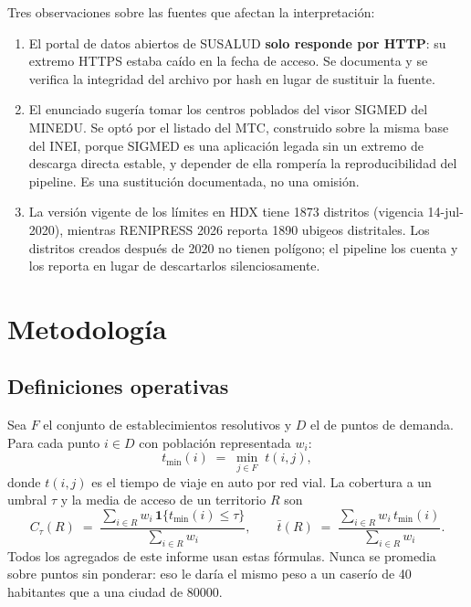\documentclass[10pt,a4paper]{article}
\begin{document}
Tres observaciones sobre las fuentes que afectan la interpretación:

\begin{enumerate}
\item El portal de datos abiertos de SUSALUD \textbf{solo responde por HTTP}: su
extremo HTTPS estaba caído en la fecha de acceso. Se documenta y se verifica la
integridad del archivo por hash en lugar de sustituir la fuente.
\item El enunciado sugería tomar los centros poblados del visor SIGMED del
MINEDU. Se optó por el listado del MTC, construido sobre la misma base del INEI,
porque SIGMED es una aplicación legada sin un extremo de descarga directa
estable, y depender de ella rompería la reproducibilidad del pipeline. Es una
sustitución documentada, no una omisión.
\item La versión vigente de los límites en HDX tiene \num{1873} distritos
(vigencia 14-jul-2020), mientras RENIPRESS 2026 reporta \num{1890} ubigeos
distritales. Los distritos creados después de 2020 no tienen polígono; el
pipeline los cuenta y los reporta en lugar de descartarlos silenciosamente.
\end{enumerate}

\section{Metodología}
\label{sec:metodologia}

\subsection{Definiciones operativas}

Sea $F$ el conjunto de establecimientos resolutivos y $D$ el de puntos de
demanda. Para cada punto $i \in D$ con población representada $w_i$:
\begin{equation}
t_{\min}(i) \;=\; \min_{j \in F} \; t(i,j),
\label{eq:tmin}
\end{equation}
donde $t(i,j)$ es el tiempo de viaje en auto por red vial. La cobertura a un
umbral $\tau$ y la media de acceso de un territorio $R$ son
\begin{equation}
C_\tau(R) \;=\; \frac{\sum_{i \in R} w_i \,\mathbf{1}\{t_{\min}(i) \le \tau\}}
{\sum_{i \in R} w_i},
\qquad
\bar{t}(R) \;=\; \frac{\sum_{i \in R} w_i \, t_{\min}(i)}{\sum_{i \in R} w_i}.
\label{eq:cobertura}
\end{equation}
Todos los agregados de este informe usan estas fórmulas. Nunca se promedia sobre
puntos sin ponderar: eso le daría el mismo peso a un caserío de 40 habitantes
que a una ciudad de \num{80000}.
\end{document}
